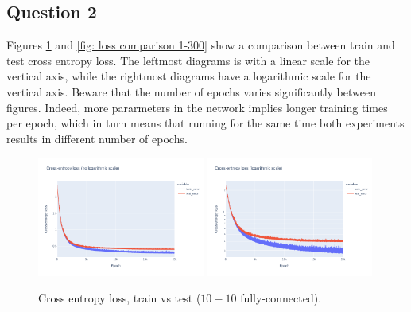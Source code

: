 \documentclass[12pt]{article}
\begin{document}
\subsection{Question 2}
Figures \ref{fig: loss comparison 2-10-10} and \ref{fig: loss comparison 1-300} show a comparison between train and test cross entropy loss.
The leftmost diagrams is with a linear scale for the vertical axis, while the rightmost diagrams have a logarithmic scale for the vertical axis.
Beware that the number of epochs varies significantly between figures.
Indeed, more pararmeters in the network implies longer training times per epoch, which in turn means that running for the same time both experiments results in different number of epochs. \\
\begin{figure}[ht]
    \centering
    \includegraphics[width=0.49\textwidth]{images/cross-entropy-comparison-2-10-10.png}
    \includegraphics[width=0.49\textwidth]{images/cross-entropy-comparison-2-10-10-log.png}
    \caption{Cross entropy loss, train vs test ($10-10$ fully-connected).}
    \label{fig: loss comparison 2-10-10}
\end{figure}
\end{document}
